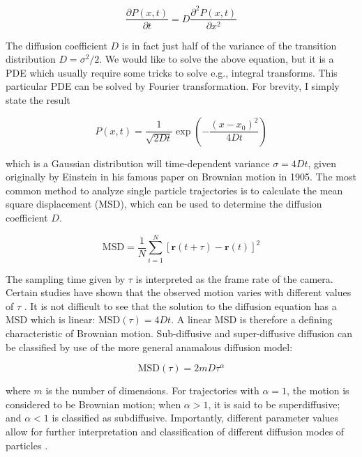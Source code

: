 \begin{equation}
\frac{\partial P(x,t)}{\partial t}  = D\frac{\partial^{2}P(x,t)}{\partial x^{2}}
\end{equation}

The diffusion coefficient $D$ is in fact just half of the variance of the transition distribution $D = \sigma^{2}/2$. We would like to solve the above equation, but it is a PDE which usually require some tricks to solve e.g., integral transforms. This particular PDE can be solved by Fourier transformation. For brevity, I simply state the result

\begin{equation}
P(x,t) = \frac{1}{\sqrt{2Dt}}\exp\left(- \frac{(x-x_{0})^{2}}{4Dt}\right)
\end{equation}

which is a Gaussian distribution will time-dependent variance $\sigma=4Dt$, given originally by Einstein in his famous paper on Brownian motion in 1905. The most common method to analyze single particle trajectories is to calculate the mean square displacement (MSD), which can be used to determine the diffusion coefficient $D$.

\begin{equation}
\text{MSD} = \frac{1}{N} \sum_{i=1}^{N} \left[ \mathbf{r}(t + \tau) - \mathbf{r}(t) \right]^2
\end{equation}

The sampling time given by $\tau$ is interpreted as the frame rate of the camera. Certain studies have shown that the observed motion varies with different values of $\tau$ \parencite{Amitai2017,Shukron2017}. It is not difficult to see that the solution to the diffusion equation has a MSD which is linear: $\text{MSD}(\tau) = 4Dt$. A linear MSD is therefore a defining characteristic of Brownian motion. Sub-diffusive and super-diffusive diffusion can be classified by use of the more general anamalous diffusion model:

\begin{equation}
\text{MSD}(\tau) = 2mD\tau^\alpha
\end{equation}

where $m$ is the number of dimensions. For trajectories with $\alpha = 1$, the motion is considered to be Brownian motion; when $\alpha > 1$, it is said to be superdiffusive; and $\alpha < 1$ is classified as subdiffusive. Importantly, different parameter values allow for further interpretation and classification of different diffusion modes of particles \parencite{Wasim2018,Zhong2020}.

